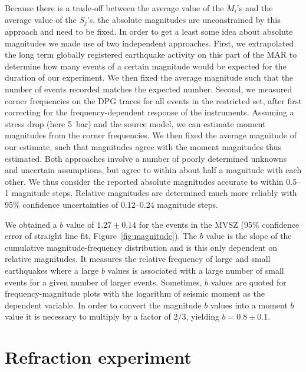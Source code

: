 \documentclass[jgr]{agu2001}
\newlength{\tw}
\begin{document}
\begin{article}
Because there is a trade-off between the average
value of the $M_i$'s and the average value of the $S_j$'s, the absolute
magnitudes are unconstrained by this approach and need to be fixed.
In order to get a least some idea about absolute magnitudes we made
use of two independent
approaches. First, we extrapolated the long term globally registered earthquake activity on this
part of the MAR to determine how many events of a certain magnitude
would be expected for the duration of our experiment. We then fixed the
average magnitude such that the number of events recorded matches the
expected number.  Second, we measured corner frequencies on the DPG
traces for all
events in the restricted set, after first correcting for the
frequency-dependent response of the instruments. Assuming a stress drop (here 5~bar) and the
\citet{brune70} source model, we can estimate moment
magnitudes from the corner frequencies. We then fixed the average magnitude of our estimate, such
that magnitudes agree with the moment magnitudes thus estimated.
Both approaches involve a number of poorly determined unknowns and
uncertain assumptions, but agree to within about half a magnitude with
each other.  We thus consider the reported absolute magnitudes
accurate to within 0.5--1 magnitude steps.  Relative magnitudes are
determined much more reliably with 95\% confidence uncertainties
of 0.12--0.24 magnitude steps.  

We obtained a $b$ value of  $1.27\pm0.14$ for the events in the MVSZ (95\%
confidence error of straight line fit, Figure~\ref{fig:magnitude}).  
The $b$ value is the slope of
the cumulative magnitude-frequency distribution and is this only
dependent on relative magnitudes. It measures the
relative frequency of large and small earthquakes where a large $b$
values is associated with a large number of small events for a given
number of larger events.
Sometimes, $b$ values are quoted for frequency-magnitude  plots with 
 the logarithm of seismic moment as the dependent variable. In order to convert the magnitude $b$ values into a
 moment $b$ value it is necessary to multiply by a factor of $2/3$,
yielding $b=0.8\pm0.1$.

\section{Refraction experiment}


\end{article}
\end{document}
